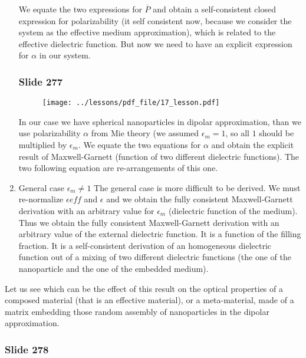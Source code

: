 \documentclass[../main/main.tex]{subfiles}
\begin{document}
\begin{enumerate}
    We equate the two expressions for $\overline{P}$ and obtain a self-consistent closed expression for polarizability (it self consistent now, because we consider the system as the effective medium approximation), which is related to the effective dielectric function.
    But now we need to have an explicit expression for $\alpha$ in our system.


\newpage

\subsubsection{Slide 277}

\begin{figure}[h!]
\centering
\texttt{[image: ../lessons/pdf\_file/17\_lesson.pdf]}
\end{figure}

    In our case we have spherical nanoparticles in dipolar approximation, than we use polarizability $\alpha$ from Mie theory (we assumed $\epsilon_{m} = 1$, so all $1$ should be multiplied by $\epsilon_{m}$.
    We equate the two equations for $\alpha$ and obtain the explicit result of Maxwell-Garnett (function of two different dielectric functions).
    The two following equation are re-arrangements of this one.

    \item{General case $\epsilon_{m} \neq 1$}
    The general case is more difficult to be derived.
    We must re-normalize $\epsilon{eff}$ and $\epsilon$ and we obtain the fully consistent Maxwell-Garnett derivation with an arbitrary value for $\epsilon_{m}$ (dielectric function of the medium).
    Thus we obtain the fully consistent Maxwell-Garnett derivation with an arbitrary value of the external dielectric function. It is a function of the filling fraction. It is a self-consistent derivation of an homogeneous dielectric function out of a mixing of two different dielectric functions (the one of the nanoparticle and the one of the embedded medium).

\end{enumerate}

 Let us see which can be the effect of this result on the optical properties of a composed material (that is an effective material), or a meta-material, made of a matrix embedding those random assembly of nanoparticles in the dipolar approximation.

\newpage

 \subsubsection{Slide 278}
\end{document}
